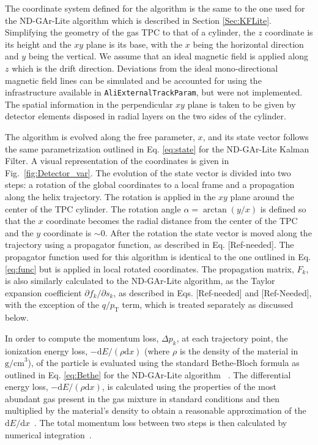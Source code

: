 The coordinate system defined for the algorithm is the same to the one used for the ND-GAr-Lite algorithm which is described in Section \ref{Sec:KFLite}. Simplifying the geometry of the gas TPC to that of a cylinder, the $z$ coordinate is its height and the $xy$ plane is its base, with the $x$ being the horizontal direction and $y$ being the vertical. We assume that an ideal magnetic field is applied along $z$ which is the drift direction. Deviations from the ideal mono-directional magnetic field lines can be simulated and be accounted for using the infrastructure available in \texttt{AliExternalTrackParam}, but were not implemented. The spatial information in the perpendicular $xy$ plane is taken to be given by detector elements disposed in radial layers on the two sides of the cylinder. 

The algorithm is evolved along the free parameter, $x$, and its state vector follows the same parametrization outlined in Eq. \ref{eq:state} for the ND-GAr-Lite Kalman Filter. A visual representation of the coordinates is given in Fig.~\ref{fig:Detector_var}. The evolution of the state vector is divided into two steps: a rotation of the global coordinates to a local frame and a propagation along the helix trajectory. The rotation is applied in the $xy$ plane around the center of the TPC cylinder. The rotation angle $\alpha = \arctan (y/x)$ is defined so that the $x$ coordinate becomes the radial distance from the center of the TPC and the $y$ coordinate is $\sim 0$. After the rotation the state vector is moved along the trajectory using a propagator function, as described in Eq. [Ref-needed]. The propagator function used for this algorithm is identical to the one outlined in Eq. \ref{eq:func} but is applied in local rotated coordinates. The propagation matrix, $F_k$, is also similarly calculated to the ND-GAr-Lite algorithm, as the Taylor expansion coefficient $\partial f_k / \partial s_k$, as described in Eqs. [Ref-needed] and [Ref-Needed], with the exception of the $q/p_{\text{T}}$ term, which is treated separately as discussed below.

In order to compute the momentum loss, $\Delta p_k$, at each trajectory point, the ionization energy loss, $-\textrm{d}E/\left(\rho\textrm{d}x\right)$ (where $\rho$ is the density of the material in $\text{g/cm}^3$), of the particle is evaluated using the standard Bethe-Bloch formula as outlined in Eq. \ref{eq:Bethe} for the ND-GAr-Lite algorithm ~\cite{PDG}. The differential energy loss, $-\textrm{d}E/\left(\rho\textrm{d}x\right)$, is calculated using the properties of the most abundant gas present in the gas mixture in standard conditions and then multiplied by the material's density to obtain a reasonable approximation of the $\textrm{d}E/\textrm{d}x$~\cite{STERNHEIMER1984261}. The total momentum loss between two steps is then calculated by numerical integration~\cite{Griffiths2010}. 

